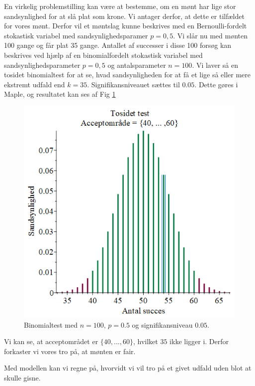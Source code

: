 \begin{exa}
En virkelig problemstilling kan være at bestemme, om en mønt har lige stor sandsynlighed for at slå plat som krone. Vi antager derfor, at dette er tilfældet for vores mønt. Derfor vil et møntslag kunne beskrives med en Bernoulli-fordelt stokastisk variabel med sandsynlighedsparamer $p = 0,5$. Vi slår nu med mønten 100 gange og får plat 35 gange. Antallet af successer i disse 100 forsøg kan beskrives ved hjælp af en binomialfordelt stokastisk variabel med sandsynlighedsparameter $p = 0,5$ og antalsparameter $n = 100$. Vi laver så en tosidet binomialtest for at se, hvad sandsynligheden for at få et lige så eller mere ekstremt udfald end $k = 35$. Signifikansniveauet sættes til $0.05$. Dette gøres i Maple, og resultatet kan ses af Fig \ref{fig:bintest}
\begin{figure}[H]
\centering
\includegraphics[width=\textwidth*3/4]{Billeder/Bintest.png}
\caption{Binomialtest med $n=100$, $p = 0.5$ og signifikansniveau $0.05$.}
\label{fig:bintest}
\end{figure}
Vi kan se, at acceptområdet er $\{ 40,...,60\}$, hvilket $35$ ikke ligger i. Derfor forkaster vi vores tro på, at mønten er fair. 

Med modellen kan vi regne på, hvorvidt vi vil tro på et givet udfald uden blot at skulle gisne. 
\end{exa}

